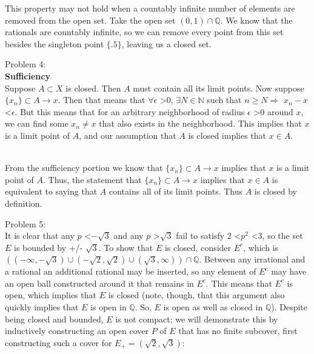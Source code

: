 \documentclass[12pt,leqno]{article}
\begin{document}
\medskip
\indent This property may not hold when a countably infinite number of elements are removed from the open set. Take the open set $(0, 1) \cap \mathds{Q}$. We know that the rationals are countably infinite, so we can remove every point from this set besides the singleton point $\{.5\}$, leaving us a closed set.


\bigskip
\noindent Problem 4:\\
{\bf Sufficiency}\\
\indent Suppose $A \subset X$ is closed. Then $A$ must contain all its limit points. Now suppose $\{x_n\} \subset A \rightarrow x$. Then that means that $\forall \epsilon$ \textgreater 0, $\exists N \in \mathds{N}$ such that $n \geq N \Rightarrow$ \textbar $x_n - x$ \textbar \textless $\epsilon.$ But this means that for an arbitrary neighborhood of radius $\epsilon$ \textgreater 0 around $x$, we can find some $x_n \neq x$ that also exists in the neighborhood. This implies that $x$ is a limit point of $A$, and our assumption that $A$ is closed implies that $x \in A$.

\medskip
{}\\
\indent From the sufficiency portion we know that $\{x_n\} \subset A \rightarrow x$ implies that $x$ is a limit point of $A$. Thus, the statement that $\{x_n\} \subset A \rightarrow x$ implies that $x \in A$ is equivalent to saying that $A$ contains all of its limit points. Thus $A$ is closed by definition.


\bigskip
\noindent Problem 5:\\
\indent It is clear that any $p$ \textless $-\sqrt{3}$ and any $p$ \textgreater $\sqrt{3}$ fail to satisfy 2 \textless $p^2$ \textless 3, so the set $E$ is bounded by +/- $\sqrt{3}$. To show that $E$ is closed, consider $E^c$, which is $((-\infty, -\sqrt{3}) \cup (-\sqrt{2}, \sqrt{2}) \cup (\sqrt{3}, \infty)) \cap \mathds{Q}$. Between any irrational and a rational an additional rational may be inserted, so any element of $E^c$ may have an open ball constructed around it that remains in $E^c$. This means that $E^c$ is open, which implies that $E$ is closed (note, though, that this argument also quickly implies that $E$ is open in $\mathds{Q}$. So, $E$ is open as well as closed in $\mathds{Q}$). Despite being closed and bounded, $E$ is not compact; we will demonstrate this by inductively constructing an open cover $P$ of $E$ that has no finite subcover, first constructing such a cover for $E_+ = (\sqrt{2}, \sqrt{3})$:
\end{document}

